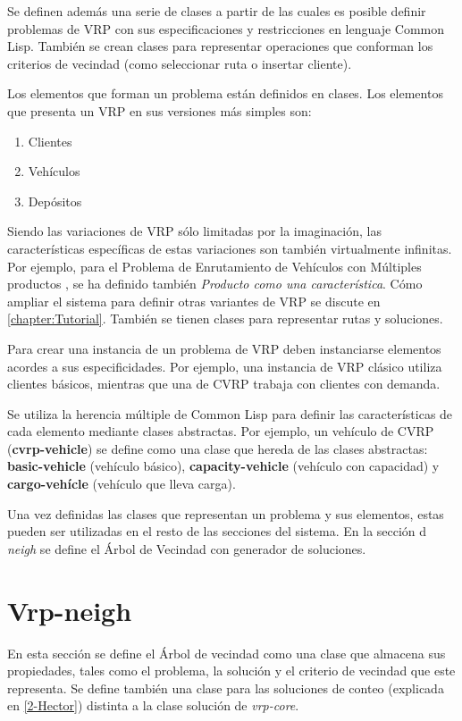 Se definen además una serie de clases a partir de las cuales es posible definir problemas de VRP con sus especificaciones y restricciones en lenguaje Common Lisp. También se crean clases para representar operaciones que conforman los criterios de vecindad (como seleccionar ruta o insertar cliente).

Los elementos que forman un problema están definidos en clases. Los elementos que presenta un VRP en sus versiones más simples son:

\begin{enumerate}
	\item Clientes
	\item Vehículos
	\item Depósitos
\end{enumerate}

Siendo las variaciones de VRP sólo limitadas por la imaginación, las características específicas de estas variaciones son también virtualmente infinitas. Por ejemplo, para el Problema de Enrutamiento de Vehículos con Múltiples productos \cite{TODO}, se ha definido también \textit{Producto como una característica}. Cómo ampliar el sistema para definir otras variantes de VRP se discute en \ref{chapter:Tutorial}. También se tienen clases para representar rutas y soluciones.

Para crear una instancia de un problema de VRP deben instanciarse elementos acordes a sus especificidades. Por ejemplo, una instancia de VRP clásico utiliza clientes básicos, mientras que una de CVRP trabaja con clientes con demanda.

Se utiliza la herencia múltiple de Common Lisp para definir las características de cada elemento mediante clases abstractas. Por ejemplo, un vehículo de CVRP (\textbf{cvrp-vehicle}) se define como una clase que hereda de las clases abstractas: \textbf{basic-vehicle} (vehículo básico), \textbf{capacity-vehicle} (vehículo con capacidad) y \textbf{cargo-vehícle} (vehículo que lleva carga).

Una vez definidas las clases que representan un problema y sus elementos, estas pueden ser utilizadas en el resto de las secciones del sistema. En la sección d \textit{neigh} se define el Árbol de Vecindad con generador de soluciones.

\section{Vrp-neigh}\label{2-neigh}
En esta sección se define el Árbol de vecindad como una clase que almacena sus propiedades, tales como el problema, la solución y el criterio de vecindad que este representa. Se define también una clase para las soluciones de conteo (explicada en \ref{2-Hector}) distinta a la clase solución de \textit{vrp-core}. 


